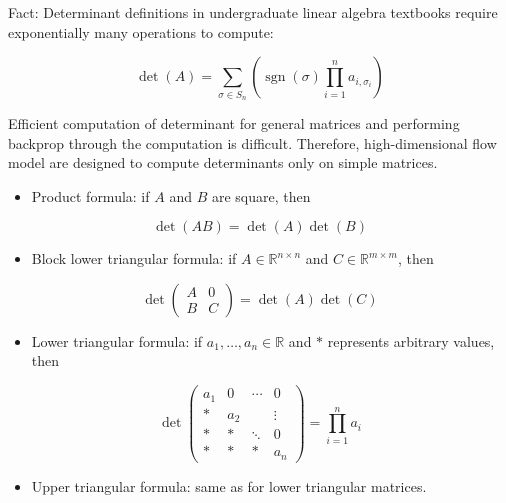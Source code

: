\documentclass{report}
\begin{document}
\begin{concept}
    Fact: Determinant definitions in undergraduate linear algebra textbooks require exponentially many operations to compute:

    $$
    \operatorname{det}(A)=\sum_{\sigma \in S_{n}}\left(\operatorname{sgn}(\sigma) \prod_{i=1}^{n} a_{i, \sigma_{i}}\right)
    $$

    Efficient computation of determinant for general matrices and performing backprop through the computation is difficult. Therefore, high-dimensional flow model are designed to compute determinants only on simple matrices.

    \begin{itemize}
        \item Product formula: if $A$ and $B$ are square, then
    \end{itemize}

    $$
    \operatorname{det}(A B)=\operatorname{det}(A) \operatorname{det}(B)
    $$

    \begin{itemize}
        \item Block lower triangular formula: if $A \in \mathbb{R}^{n \times n}$ and $C \in \mathbb{R}^{m \times m}$, then
    \end{itemize}

    $$
    \operatorname{det}\left(\begin{array}{ll}
    A & 0 \\
    B & C
    \end{array}\right)=\operatorname{det}(A) \operatorname{det}(C)
    $$

    \begin{itemize}
        \item Lower triangular formula: if $a_{1}, \ldots, a_{n} \in \mathbb{R}$ and $*$ represents arbitrary values, then
    \end{itemize}

    $$
    \operatorname{det}\left(\begin{array}{cccc}
    a_{1} & 0 & \cdots & 0 \\
    * & a_{2} & & \vdots \\
    * & * & \ddots & 0 \\
    * & * & * & a_{n}
    \end{array}\right)=\prod_{i=1}^{n} a_{i}
    $$

    \begin{itemize}
        \item Upper triangular formula: same as for lower triangular matrices.
    \end{itemize}
\end{concept}
\end{document}

